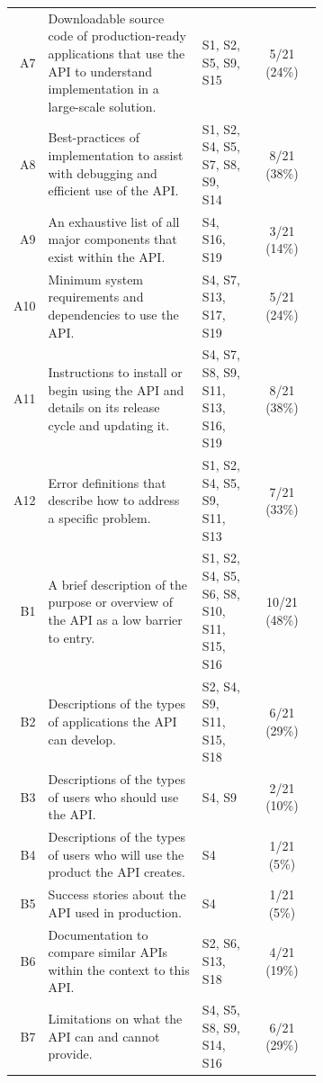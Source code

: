 \begin{small}
\begin{longtable}{rp{0.5\linewidth}|p{0.175\linewidth}|c}
  A7&
  Downloadable source code of production-ready applications that use the API to understand implementation in a large-scale solution.
  &
  S1, S2, S5, S9, S15 &
  5/21 (24\%)\\

  A8&
  Best-practices of implementation to assist with debugging and efficient use of the API.
  &
  S1, S2, S4, S5, S7, S8, S9, S14 &
  8/21 (38\%)\\

  A9&
  An exhaustive list of all major components that exist within the API.
  &
  S4, S16, S19 &
  3/21 (14\%)\\

  A10&
  Minimum system requirements and dependencies to use the API.
  &
  S4, S7, S13, S17, S19 &
  5/21 (24\%)\\
  
  A11&
  Instructions to install or begin using the API and details on its release cycle and updating it.
  &
  S4, S7, S8, S9, S11, S13, S16, S19 &
  8/21 (38\%)\\

  A12&
  Error definitions that describe how to address a specific problem.
  &
  S1, S2, S4, S5, S9, S11, S13 &
  7/21 (33\%)\\

  \midrule
  
  {B1}&
  {A brief description of the purpose or overview of the API as a low barrier to entry.}
  &
  {S1, S2, S4, S5, S6, S8, S10, S11, S15, S16} &
  {10/21 (48\%)}\\

  B2&
  Descriptions of the types of applications the API can develop.
  &
  S2, S4, S9, S11, S15, S18 &
  6/21 (29\%)\\

  B3&
  Descriptions of the types of users who should use the API.
  &
  S4, S9 &
  2/21 (10\%)\\


  B4&
  Descriptions of the types of users who will use the product the API creates.
  &
  S4 &
  1/21 (5\%)\\


  B5&
  Success stories about the API used in production.
  &
  S4 &
  1/21 (5\%)\\


  B6&
  Documentation to compare similar APIs within the context to this API.
  &
  S2, S6, S13, S18 &
  4/21 (19\%)\\


  B7&
  Limitations on what the API can and cannot provide.
  &
  S4, S5, S8, S9, S14, S16 &
  6/21 (29\%)\\


\end{longtable}
\end{small}
